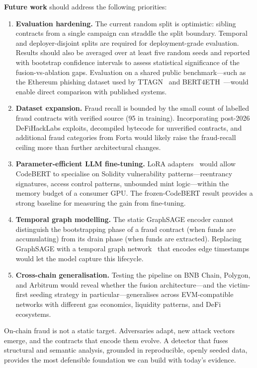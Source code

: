 \textbf{Future work} should address the following priorities:

\begin{enumerate}
    \item \textbf{Evaluation hardening.}  The current random split is
    optimistic: sibling contracts from a single campaign can straddle the
    split boundary.  Temporal and deployer-disjoint splits are required
    for deployment-grade evaluation.  Results should also be averaged
    over at least five random seeds and reported with bootstrap confidence
    intervals to assess statistical significance of the fusion-vs-ablation
    gaps.  Evaluation on a shared public benchmark---such as the Ethereum
    phishing dataset used by TTAGN~\cite{li2022ttagn} and
    BERT4ETH~\cite{hu2023bert4eth}---would enable direct comparison with
    published systems.

    \item \textbf{Dataset expansion.}  Fraud recall is bounded by the
    small count of labelled fraud contracts with verified source (95 in
    training).  Incorporating post-2026 DeFiHackLabs exploits, decompiled
    bytecode for unverified contracts, and additional fraud categories from
    Forta would likely raise the fraud-recall ceiling more than further
    architectural changes.

    \item \textbf{Parameter-efficient LLM fine-tuning.}
    LoRA adapters~\cite{hu2022lora} would allow CodeBERT to specialise
    on Solidity vulnerability patterns---reentrancy signatures, access
    control patterns, unbounded mint logic---within the memory budget of
    a consumer GPU.  The frozen-CodeBERT result provides a strong
    baseline for measuring the gain from fine-tuning.

    \item \textbf{Temporal graph modelling.}
    The static GraphSAGE encoder cannot distinguish the bootstrapping
    phase of a fraud contract (when funds are accumulating) from its
    drain phase (when funds are extracted).  Replacing GraphSAGE with a
    temporal graph network~\cite{wu2024tokenscout} that encodes edge
    timestamps would let the model capture this lifecycle.

    \item \textbf{Cross-chain generalisation.}  Testing the pipeline on
    BNB Chain, Polygon, and Arbitrum would reveal whether the fusion
    architecture---and the victim-first seeding strategy in
    particular---generalises across EVM-compatible networks with
    different gas economics, liquidity patterns, and DeFi ecosystems.
\end{enumerate}

On-chain fraud is not a static target.  Adversaries adapt, new attack
vectors emerge, and the contracts that encode them evolve.  A detector
that fuses structural and semantic analysis, grounded in reproducible,
openly seeded data, provides the most defensible foundation we can build
with today's evidence.
